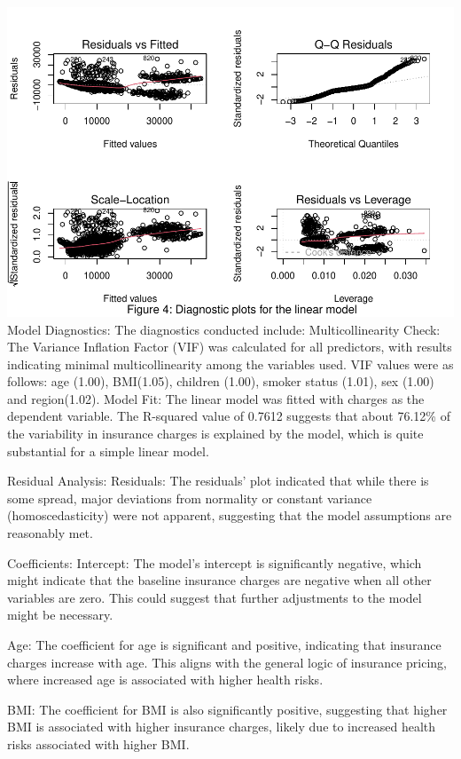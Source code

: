 \documentclass[
  12pt,
]{article}
\begin{document}
\includegraphics{finalproject_files/figure-latex/unnamed-chunk-19-1.pdf}
Model Diagnostics: The diagnostics conducted include: Multicollinearity
Check: The Variance Inflation Factor (VIF) was calculated for all
predictors, with results indicating minimal multicollinearity among the
variables used. VIF values were as follows: age (1.00), BMI(1.05),
children (1.00), smoker status (1.01), sex (1.00) and region(1.02).
Model Fit: The linear model was fitted with charges as the dependent
variable. The R-squared value of 0.7612 suggests that about 76.12\% of
the variability in insurance charges is explained by the model, which is
quite substantial for a simple linear model.

Residual Analysis: Residuals: The residuals' plot indicated that while
there is some spread, major deviations from normality or constant
variance (homoscedasticity) were not apparent, suggesting that the model
assumptions are reasonably met.

Coefficients: Intercept: The model's intercept is significantly
negative, which might indicate that the baseline insurance charges are
negative when all other variables are zero. This could suggest that
further adjustments to the model might be necessary.

Age: The coefficient for age is significant and positive, indicating
that insurance charges increase with age. This aligns with the general
logic of insurance pricing, where increased age is associated with
higher health risks.

BMI: The coefficient for BMI is also significantly positive, suggesting
that higher BMI is associated with higher insurance charges, likely due
to increased health risks associated with higher BMI.
\end{document}
